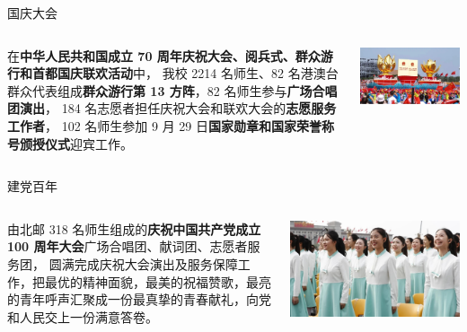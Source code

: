 \documentclass[aspectratio=169, utf8, fontset=windows]{beamer}
\begin{document}
\begin{frame}{国庆大会}
    \begin{columns}
        \setlength{\parindent}{2em}

        在\textcolor{Fore}{\textbf{中华人民共和国成立 70 周年庆祝大会、阅兵式、群众游行和首都国庆联欢活动}}中，
        我校 2214 名师生、82 名港澳台群众代表组成\textcolor{Fore}{\textbf{群众游行第 13 方阵}}，82 名师生参与\textcolor{Fore}{\textbf{广场合唱团演出}}，
        184 名志愿者担任庆祝大会和联欢大会的\textcolor{Fore}{\textbf{志愿服务工作者}}，
        102 名师生参加 9 月 29 日\textcolor{Fore}{\textbf{国家勋章和国家荣誉称号颁授仪式}}迎宾工作。

        \includegraphics[width=\textwidth]{./resources/27.png}
    \end{columns}
\end{frame}

\begin{frame}{建党百年}
    \begin{columns}
        \setlength{\parindent}{2em}

        由北邮 318 名师生组成的\textcolor{Fore}{\textbf{庆祝中国共产党成立 100 周年大会}}广场合唱团、献词团、志愿者服务团，
        圆满完成庆祝大会演出及服务保障工作，把最优的精神面貌，最美的祝福赞歌，最亮的青年呼声汇聚成一份最真挚的青春献礼，向党和人民交上一份满意答卷。

        \includegraphics[width=\textwidth]{./resources/28.jpg}
    \end{columns}
\end{frame}
\end{document}
